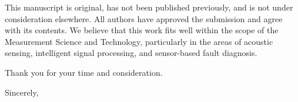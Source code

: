 \documentclass[a4paper,12pt]{letter}
\begin{document}
\begin{letter}
This manuscript is original, has not been published previously, and is not under consideration elsewhere. All authors have approved the submission and agree with its contents. We believe that this work fits well within the scope of the Measurement Science and Technology, particularly in the areas of acoustic sensing, intelligent signal processing, and sensor-based fault diagnosis.

Thank you for your time and consideration.

\closing{Sincerely,}

\end{letter}
\end{document}
